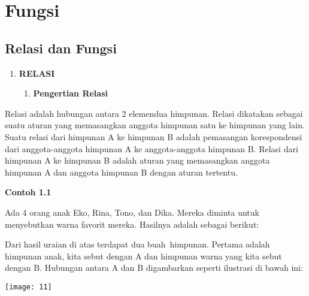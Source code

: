 \documentclass[11pt,fleqn]{book} %
\begin{document}

\chapter{Fungsi}

\section{Relasi dan Fungsi}

\begin{enumerate}
\item \textbf{ RELASI}

\begin{enumerate}
\item \textbf{ Pengertian Relasi}
\end{enumerate}
\end{enumerate}

\noindent 

 Relasi adalah hubungan antara 2 elemendua himpunan. Relasi dikatakan sebagai suatu aturan yang memasangkan anggota himpunan satu ke himpunan yang lain. Suatu relasi dari himpunan A ke himpunan B adalah pemasangan korespondensi dari anggota-anggota himpunan A ke anggota-anggota himpunan B. Relasi dari himpunan A ke himpunan B adalah aturan yang memasangkan anggota himpunan A dan anggota himpunan B dengan aturan tertentu.

\noindent 

\noindent \textbf{Contoh 1.1}

\noindent Ada 4 orang anak Eko, Rina, Tono, dan Dika. Mereka diminta untuk menyebutkan warna favorit mereka. Hasilnya adalah sebagai berikut:

\noindent 

\noindent 

\noindent 

\noindent 

\noindent 

\noindent 

\noindent Dari hasil uraian di atas terdapat dua buah~himpunan. Pertama adalah himpunan anak, kita sebut dengan A dan himpunan warna yang kita sebut dengan B. Hubungan antara A dan B digambarkan seperti ilustrasi di bawah ini:

\noindent 

\begin{center}
\noindent \texttt{[image: 11]}
\end{center}
\end{document}
